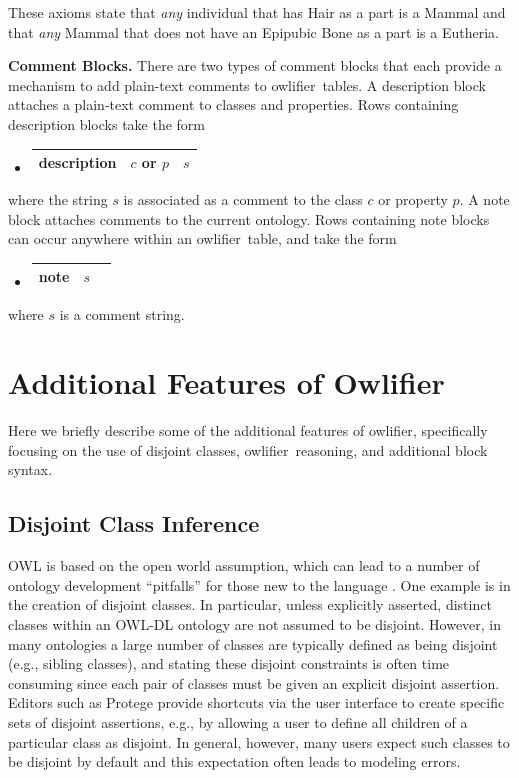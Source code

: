 \documentclass[5p,authoryear]{elsarticle}
\newcommand{\Owlifier}{\textsf{Owlifier}}
\newcommand{\owlifier}{\textsf{owlifier}}
\newcommand{\myblock}[1]{\vspace{12pt}\noindent\textbf{#1}}
\begin{document}
These axioms state that \emph{any} individual that has Hair as a part is a Mammal and that \emph{any} Mammal that does not have an Epipubic Bone as a part is a Eutheria.

\myblock{Comment Blocks.} There are two types of comment blocks that
each provide a mechanism to add plain-text comments to \owlifier\
tables. A description block attaches a plain-text comment to classes
and properties. Rows containing description blocks take the form
\begin{itemize}
\item[]
  \begin{tabular}{|l|l|l|}\hline \textsf{description} & $c$ or $p$ & $s$
    \\ \hline
  \end{tabular}
\end{itemize}
where the string $s$ is associated as a comment to the class $c$ or
property $p$. A note block attaches comments to the current
ontology. Rows containing note blocks can occur anywhere within an
\owlifier\ table, and take the form
\begin{itemize}
\item[]
  \begin{tabular}{|l|l|l|}\hline \textsf{note} & $s$
\\ \hline
  \end{tabular}
\end{itemize}
where $s$ is a comment string. 


\section{Additional Features of \Owlifier}
\label{sec:features}

Here we briefly describe some of the additional features of \owlifier,
specifically focusing on the use of disjoint classes, \owlifier\
reasoning, and additional block syntax.
 
\subsection{Disjoint Class Inference}

OWL is based on the open world assumption, which can lead to a number
of ontology development ``pitfalls'' for those new to the language
\citep{smith04:_owl_web_ontol_languag_guide,rector04:_owl_pizzas}. One
example is in the creation of disjoint classes.  In particular, unless
explicitly asserted, distinct classes within an OWL-DL ontology are
not assumed to be disjoint. However, in many ontologies a large number
of classes are typically defined as being disjoint (e.g., sibling
classes), and stating these disjoint constraints is often
time consuming since each pair of classes must be given an explicit
disjoint assertion. Editors such as Protege
\citep{knublauch04:_editin_descr_logic_ontol_with} provide shortcuts
via the user interface to create specific sets of disjoint assertions,
e.g., by allowing a user to define all children of a particular class
as disjoint. In general, however, many users expect such classes to be
disjoint by default \citep{rector04:_owl_pizzas} and this expectation
often leads to modeling errors.
\end{document}
